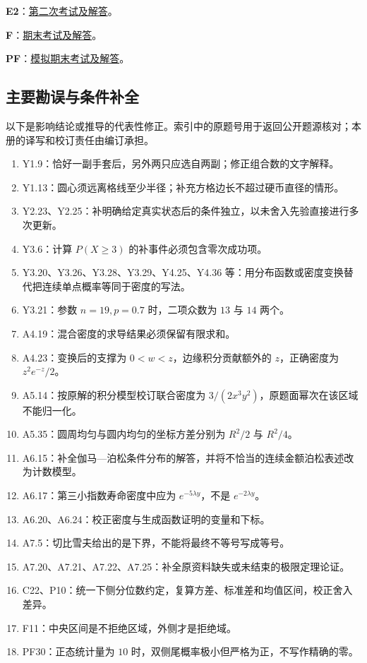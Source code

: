 \documentclass[12pt,fontset=fandol]{ctexart}
\begin{document}
\noindent\textbf{E2}：\href{https://ocw.mit.edu/courses/18-05-introduction-to-probability-and-statistics-spring-2022/mit18_05_s22_exam02_sol.pdf}{第二次考试及解答}。\par

\noindent\textbf{F}：\href{https://ocw.mit.edu/courses/18-05-introduction-to-probability-and-statistics-spring-2022/mit18_05_s22_exam_final_sol.pdf}{期末考试及解答}。\par

\noindent\textbf{PF}：\href{https://ocw.mit.edu/courses/18-05-introduction-to-probability-and-statistics-spring-2022/mit18_05_s22_prac_exam_final_sol.pdf}{模拟期末考试及解答}。\par

\subsection*{主要勘误与条件补全}
以下是影响结论或推导的代表性修正。索引中的原题号用于返回公开题源核对；本册的译写和校订责任由编订承担。
\begin{enumerate}
\item Y1.9：恰好一副手套后，另外两只应选自两副；修正组合数的文字解释。
\item Y1.13：圆心须远离格线至少半径；补充方格边长不超过硬币直径的情形。
\item Y2.23、Y2.25：补明确给定真实状态后的条件独立，以未舍入先验直接进行多次更新。
\item Y3.6：计算 $P(X\ge3)$ 的补事件必须包含零次成功项。
\item Y3.20、Y3.26、Y3.28、Y3.29、Y4.25、Y4.36 等：用分布函数或密度变换替代把连续单点概率等同于密度的写法。
\item Y3.21：参数 $n=19,p=0.7$ 时，二项众数为 $13$ 与 $14$ 两个。
\item A4.19：混合密度的求导结果必须保留有限求和。
\item A4.23：变换后的支撑为 $0<w<z$，边缘积分贡献额外的 $z$，正确密度为 $z^2e^{-z}/2$。
\item A5.14：按原解的积分模型校订联合密度为 $3/(2x^3y^2)$，原题面幂次在该区域不能归一化。
\item A5.35：圆周均匀与圆内均匀的坐标方差分别为 $R^2/2$ 与 $R^2/4$。
\item A6.15：补全伽马—泊松条件分布的解答，并将不恰当的连续金额泊松表述改为计数模型。
\item A6.17：第三小指数寿命密度中应为 $e^{-5\lambda y}$，不是 $e^{-2\lambda y}$。
\item A6.20、A6.24：校正密度与生成函数证明的变量和下标。
\item A7.5：切比雪夫给出的是下界，不能将最终不等号写成等号。
\item A7.20、A7.21、A7.22、A7.25：补全原资料缺失或未结束的极限定理论证。
\item C22、P10：统一下侧分位数约定，复算方差、标准差和均值区间，校正舍入差异。
\item F11：中央区间是不拒绝区域，外侧才是拒绝域。
\item PF30：正态统计量为 $10$ 时，双侧尾概率极小但严格为正，不写作精确的零。
\end{enumerate}
\end{document}
